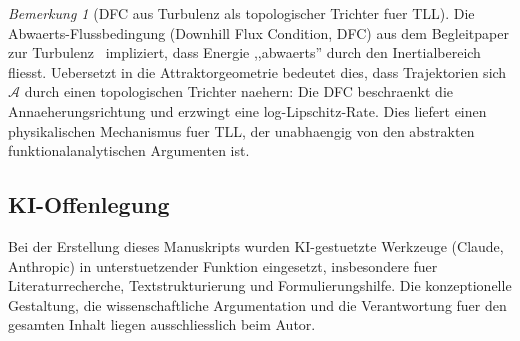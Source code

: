 \documentclass[12pt,a4paper]{article}
\theoremstyle{definition}
\theoremstyle{plain}
\theoremstyle{remark}
\newtheorem{remark}[definition]{Bemerkung}
\begin{document}
\begin{remark}[DFC aus Turbulenz als topologischer Trichter fuer TLL]
\label{rem:dfc-funnel}
Die Abwaerts-Flussbedingung (Downhill Flux Condition, DFC) aus dem Begleitpaper zur Turbulenz~\cite{FST-NS2026} impliziert, dass Energie ,,abwaerts'' durch den Inertialbereich fliesst. Uebersetzt in die Attraktorgeometrie bedeutet dies, dass Trajektorien sich $\mathcal{A}$ durch einen topologischen Trichter naehern: Die DFC beschraenkt die Annaeherungsrichtung und erzwingt eine log-Lipschitz-Rate. Dies liefert einen physikalischen Mechanismus fuer TLL, der unabhaengig von den abstrakten funktionalanalytischen Argumenten ist.
\end{remark}


\subsection*{KI-Offenlegung}
Bei der Erstellung dieses Manuskripts wurden KI-gestuetzte Werkzeuge
(Claude, Anthropic) in unterstuetzender Funktion eingesetzt,
insbesondere fuer Literaturrecherche, Textstrukturierung und
Formulierungshilfe.  Die konzeptionelle Gestaltung, die
wissenschaftliche Argumentation und die Verantwortung fuer den
gesamten Inhalt liegen ausschliesslich beim Autor.
\end{document}
